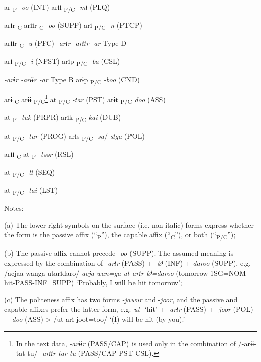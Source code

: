    ar\textsubscript{ P}  \textit{{}-oo} (INT)      arɨɨ\textsubscript{ P/C}    \textit{{}-mɨ} (PLQ)

arɨr\textsubscript{ C}  arɨɨr\textsubscript{ C}    \textit{{}-oo} (SUPP)    arɨ\textsubscript{ P/C}      \textit{{}-n} (PTCP)

  arɨɨr\textsubscript{ C}    \textit{{}-u} (PFC)    \textit{{}-arɨr  {}-arɨɨr  {}-ar} Type D

arɨ\textsubscript{ P/C}      \textit{{}-i} (NPST)    arɨp\textsubscript{ P/C}      \textit{{}-ba} (CSL)

\textit{{}-arɨr  {}-arɨɨr  {}-ar} Type B    arɨp\textsubscript{ P/C}      \textit{{}-boo} (CND)

arɨ\textsubscript{ C}  arɨɨ\textsubscript{ P/C}\footnote{In the text data, \textit{{}-arɨɨr} (PASS/CAP) is used only in the combination of /-arɨɨ-tat-tu/ \textit{{}-arɨɨr-tar-tu} (PASS/CAP-PST-CSL).}  at\textsubscript{ P/C}  \textit{{}-tar} (PST)    arɨt\textsubscript{ P/C}      \textit{doo}  (ASS)

    at\textsubscript{ P}  \textit{{}-tuk} (PRPR)    arɨk\textsubscript{ P/C}      \textit{kai}  (DUB)

    at\textsubscript{ P/C}  \textit{{}-tur} (PROG)    arɨs\textsubscript{ P/C}      \textit{{}-sa}/\textit{{}-sɨga}  (POL)

  arɨɨ\textsubscript{ C}  at\textsubscript{ P}  \textit{{}-təər} (RSL)            

    at\textsubscript{ P/C}  \textit{{}-tɨ} (SEQ)            

    at\textsubscript{ P/C}  \textit{{}-tai} (LST)            

Notes:

(a) The lower right symbols on the surface (i.e. non-italic) forms express whether the form is the passive affix (“\textsubscript{P}”), the capable affix (“\textsubscript{C}”), or both (“\textsubscript{P/C}”);

(b) The passive affix cannot precede \textit{{}-oo} (SUPP). The assumed meaning is expressed by the combination of \textit{{}-arɨr} (PASS) + \textit{{}-Ø} (INF) + \textit{daroo} (SUPP), e.g. /acjaa wanga utarɨdaro/ \textit{acja} \textit{wan=ga} \textit{ut-arɨr-Ø=daroo} (tomorrow 1SG=NOM hit-PASS-INF=SUPP) ‘Probably, I will be hit tomorrow’;

(c) The politeness affix has two forms \textit{{}-jawur} and -\textit{joor}, and the passive and capable affixes prefer the latter form, e.g. \textit{ut-} ‘hit’ + \textit{{}-arɨr} (PASS) + \textit{{}-joor} (POL) + \textit{doo} (ASS) > /ut-arɨ-joot=too/ ‘(I) will be hit (by you).’

